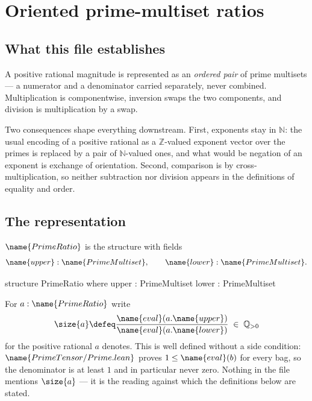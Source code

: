 
\section{Oriented prime-multiset ratios}
\label{Ratio:sec}


\subsection*{What this file establishes}

A positive rational magnitude is represented as an \emph{ordered pair} of
prime multisets --- a numerator and a denominator carried separately, never
combined.  Multiplication is componentwise, inversion swaps the two
components, and division is multiplication by a swap.

Two consequences shape everything downstream.  First, exponents stay in
$\mathbb{N}$: the usual encoding of a positive rational as a
$\mathbb{Z}$-valued exponent vector over the primes is replaced by a pair of
$\mathbb{N}$-valued ones, and what would be negation of an exponent is
exchange of orientation.  Second, comparison is by cross-multiplication, so
neither subtraction nor division appears in the definitions of equality and
order.

\subsection{The representation}

\begin{definition}
\label{Ratio:def:primeratio}
$\name{PrimeRatio}$ is the structure with fields
\[
  \name{upper} : \name{PrimeMultiset},
  \qquad
  \name{lower} : \name{PrimeMultiset}.
\]
\end{definition}

\begin{leancode}
structure PrimeRatio where
  upper : PrimeMultiset
  lower : PrimeMultiset
\end{leancode}

\begin{notation}\label{Ratio:not:denote}
For $a : \name{PrimeRatio}$ write
\[
  \size{a} \defeq
    \frac{\name{eval}(a.\name{upper})}{\name{eval}(a.\name{lower})}
  \;\in\; \mathbb{Q}_{>0}
\]
for the positive rational $a$ denotes.  This is well defined without a side
condition: $\name{PrimeTensor/Prime.lean}$ proves
$1 \leq \name{eval}(b)$ for every bag, so the denominator is at least $1$ and
in particular never zero.  Nothing in the file mentions $\size{a}$ ---
it is the reading against which the definitions below are stated.
\end{notation}

